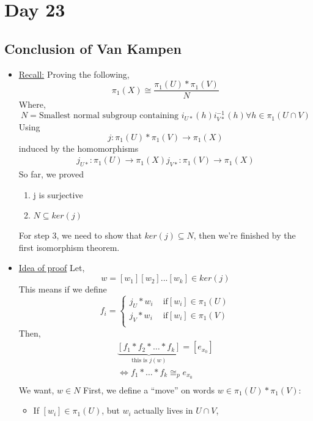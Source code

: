 \documentclass[../notes.tex]{subfiles}
\begin{document}
\section{Day 23}
\subsection{Conclusion of Van Kampen}
\begin{itemize}
    \item \underline{Recall:}
        Proving the following,
        \[
            \pi_1(X)\cong \frac{\pi_1(U)*\pi_1(V)}{N}
        \]
        Where,
        \[
            N=\text{Smallest normal subgroup containing $i_{U*}(h)i_{V*}^{-1}(h)\forall h\in\pi_1(U\cap V)$}
        \]
        Using
        \[
            j:\pi_1(U)*\pi_1(V)\rightarrow \pi_1(X)
        \]
        induced by the homomorphisms
        \begin{align*}
            j_{U*}:\pi_1(U)\rightarrow \pi_1(X)
            j_{V*}:\pi_1(V)\rightarrow \pi_1(X)
        \end{align*}
        So far, we proved
        \begin{enumerate}
            \item j is surjective
            \item $N\subseteq ker(j)$
        \end{enumerate}
        For step 3, we need to show that $ker(j)\subseteq N$, then we're
        finished by the first isomorphism theorem.
    \item \underline{Idea of proof} Let,
        \[
            w=[w_1][w_2]...[w_k]\in ker(j)
        \]
        This means if we define
        \[
            f_i = \begin{cases}
                j_U*w_i & \text{ if} [w_i]\in \pi_1(U)\\
                j_V*w_i & \text{ if} [w_i]\in \pi_1(V)\\
            \end{cases}
        \]
        Then,
        \begin{align*}
            \underbrace{[f_1*f_2*\dots*f_k]}_{\text{this is $j(w)$}}=[e_{x_0}]\\
            \iff f_1*\dots*f_k\cong_{p}e_{x_0}\\
        \end{align*}
        We want, $w\in N$
        First, we define a ``move'' on words $w\in \pi_1(U)*\pi_1(V)$:
        \begin{itemize}
            \item If $[w_i]\in \pi_1(U)$, but $w_i$ actually lives in $U\cap V$, 

\end{itemize}
\end{itemize}
\end{document}
